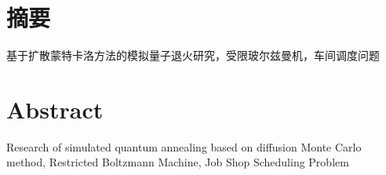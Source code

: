 \maketitle%
\MAKETITLE%
\makedeclaration%
\intobmk\chapter*{摘\quad 要}%
\setcounter{page}{1}%

基于扩散蒙特卡洛方法的模拟量子退火研究，受限玻尔兹曼机，车间调度问题

\intobmk\chapter*{Abstract}%

Research of simulated quantum annealing based on diffusion Monte Carlo method, Restricted Boltzmann Machine, Job Shop Scheduling Problem

